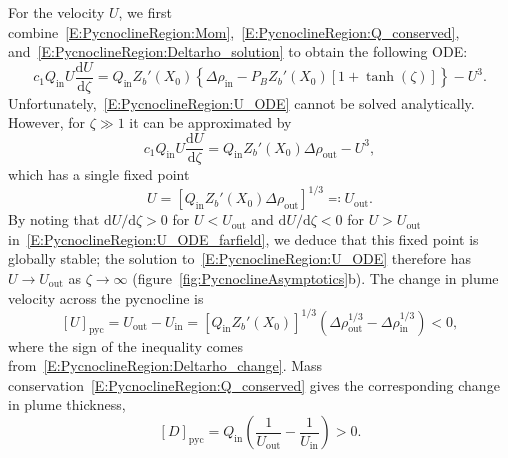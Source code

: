 \documentclass[openacc]{rsproca_new}%
\newcommand{\dd}[2]{\frac{\mathrm{d} #1}{\mathrm{d} #2}}
\newcommand{\Pb}{\textit{P}_B}  %
\newcommand{\cone}{c_1}  %
\renewcommand{\in}{\text{in}} %
\newcommand{\out}{\text{out}}
\begin{document}
For the velocity $U$, we first combine~\eqref{E:PycnoclineRegion:Mom},~\eqref{E:PycnoclineRegion:Q_conserved}, and~\eqref{E:PycnoclineRegion:Deltarho_solution} to obtain the following ODE: 
\begin{equation}\label{E:PycnoclineRegion:U_ODE}
\cone Q_\in U \dd{U}{\zeta} = Q_\in Z_b'(X_0)\left\{\Delta \rho_\in - \Pb Z_b'(X_0) \left[1 + \tanh(\zeta)\right]\right\} - U^3.
\end{equation}
Unfortunately,~\eqref{E:PycnoclineRegion:U_ODE} cannot be solved analytically. However, for $\zeta \gg 1$ it can be approximated by
\begin{equation}\label{E:PycnoclineRegion:U_ODE_farfield}
\cone Q_\in U \dd{U}{\zeta} = Q_\in Z_b'(X_0)\Delta \rho_\out - U^3,
\end{equation}
which has a single fixed point 
\begin{equation}\label{E:PycnoclineRegion:U_Limit}
U = \left[ Q_\in Z_b'(X_0)\Delta \rho_\out\right]^{1/3}  \eqcolon U_\out.
\end{equation}
By noting that $\mathrm{d}U/\mathrm{d}\zeta > 0$  for $U < U_\out$ and $\mathrm{d}U/\mathrm{d}\zeta < 0$  for $U > U_\out$ in~\eqref{E:PycnoclineRegion:U_ODE_farfield}, we deduce that this fixed point is globally stable; the solution to~\eqref{E:PycnoclineRegion:U_ODE} therefore has $U \to U_\out$ as $\zeta \to \infty$ (figure~\ref{fig:PycnoclineAsymptotics}b). The change in plume velocity across the pycnocline is
\begin{equation}\label{E:PycnoclineRegion:U_change}
\left[U\right]_{\text{pyc}} = U_\out - U_\in = \left[Q_\in Z_b'(X_0)\right]^{1/3} \left(\Delta \rho_\out^{1/3} - \Delta \rho_\in^{1/3}\right) < 0,
\end{equation}
where the sign of the inequality comes from~\eqref{E:PycnoclineRegion:Deltarho_change}. Mass conservation~\eqref{E:PycnoclineRegion:Q_conserved} gives the corresponding change in plume thickness,
\begin{equation}\label{E:PycnoclineRegion:D_change}
\left[D\right]_{\text{pyc}} = Q_\in \left(\frac{1}{U_\out} - \frac{1}{U_\in}\right) > 0.
\end{equation}
\end{document}
